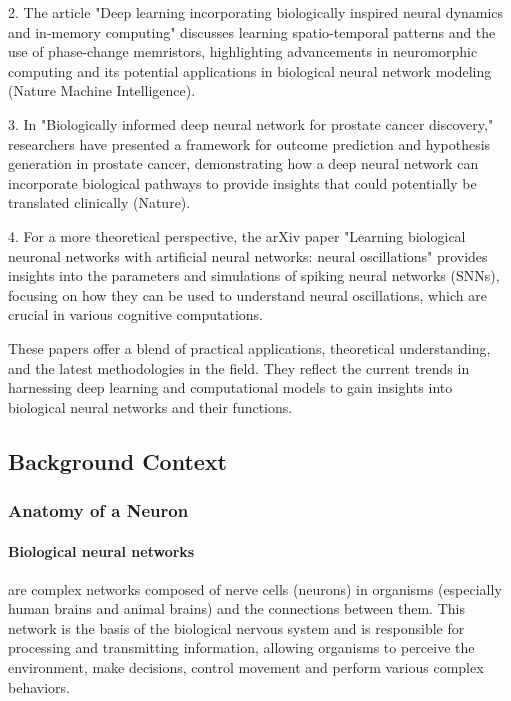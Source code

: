 \documentclass[paper=a4, fontsize=11pt]{scrartcl} %
\numberwithin{equation}{section} %
\numberwithin{figure}{section} %
\numberwithin{table}{section} %
\begin{document}
2. The article "Deep learning incorporating biologically inspired neural dynamics and in-memory computing" discusses learning spatio-temporal patterns and the use of phase-change memristors, highlighting advancements in neuromorphic computing and its potential applications in biological neural network modeling (Nature Machine Intelligence).

3. In "Biologically informed deep neural network for prostate cancer discovery," researchers have presented a framework for outcome prediction and hypothesis generation in prostate cancer, demonstrating how a deep neural network can incorporate biological pathways to provide insights that could potentially be translated clinically (Nature).

4. For a more theoretical perspective, the arXiv paper "Learning biological neuronal networks with artificial neural networks: neural oscillations" provides insights into the parameters and simulations of spiking neural networks (SNNs), focusing on how they can be used to understand neural oscillations, which are crucial in various cognitive computations.

These papers offer a blend of practical applications, theoretical understanding, and the latest methodologies in the field. They reflect the current trends in harnessing deep learning and computational models to gain insights into biological neural networks and their functions.



















\subsection{Background Context}
\subsubsection{Anatomy of a Neuron}
\paragraph{Biological neural networks}
 are complex networks composed of nerve cells (neurons) in organisms (especially human brains and animal brains) and the connections between them. This network is the basis of the biological nervous system and is responsible for processing and transmitting information, allowing organisms to perceive the environment, make decisions, control movement and perform various complex behaviors.
\end{document}
